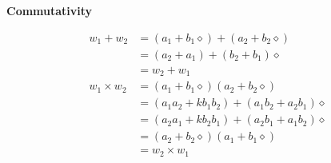 \documentclass[addpoints]{exam}
\theoremstyle{mytheoremstyle}
\theoremstyle{mytheoremstyle}
\theoremstyle{myproblemstyle}
\begin{document}
\begin{questions}
\begin{parts}
\begin{solution}
            \textbf{Commutativity}

            \begin{align*}
                w_{1}+w_{2}       & = (a_{1}+b_{1}\diamond)+(a_{2}+b_{2}\diamond)              \\
                                  & = (a_{2}+a_{1})+(b_{2}+b_{1})\diamond                      \\
                                  & = w_{2}+w_{1}                                              \\
                w_{1}\times w_{2} & = (a_{1}+b_{1}\diamond)(a_{2}+b_{2}\diamond)               \\
                                  & = (a_{1}a_{2}+kb_{1}b_{2})+(a_{1}b_{2}+a_{2}b_{1})\diamond \\
                                  & = (a_{2}a_{1}+kb_{2}b_{1})+(a_{2}b_{1}+a_{1}b_{2})\diamond \\
                                  & = (a_{2}+b_{2}\diamond)(a_{1}+b_{1}\diamond)               \\
                                  & = w_{2}\times w_{1}
            \end{align*}



\end{solution}
\end{parts}
\end{questions}
\end{document}
